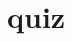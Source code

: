 \documentclass[aspectratio=169,xcolor={dvipsnames,table}]{beamer}
\newcommand{\myaudio}[1]{\href{#1}{\faVolumeUp}}
\begin{document}
%
%
%
%
%
%
%
%
%
%
%
%  

\section*{quiz}
%
%
%
%
%
%
\end{document}
